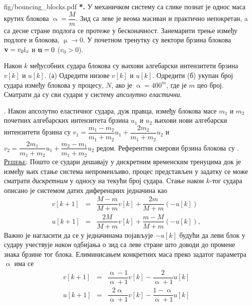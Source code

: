 \newpage
\begin{slikaDesno}{fig/bouncing_blocks.pdf}
\textbf{{\color{red}*}\ID.}
    У механичком систему са слике познат
је однос 
маса крутих блокова $
\upalpha = \dfrac{M}{m}$. 
Зид са леве је веома масиван и 
практично непокретан, a са десне стране подлога 
се протеже у бесконачност.
Занемарити трење између подлоге 
и блокова, 
$\upmu \to 0$. 
У почетном тренутку су вектори брзина 
блокова
${\bf v} = v_0 {\rm i}_x$ и
${\bf u} = 0$ ($v_0 > 0$). 
\end{slikaDesno}
Након $k$ међусобних судара блокова су 
њихови алгебарски интензитети брзина 
$v[k]$ и $u[k]$.
(а) Одредити низове $v[k]$ и $u[k]$.
Одредити (б) укупан
број судара између блокова у процесу, $N$, 
ако је $\upalpha = 400^m$, где је $m$ цео број.
Сматрати да су сви судари у систему 
\textit{апсолутно еластични}. 

\textit{}. Након 
апсолутно еластичног
судара, дуж правца, између блокова масе $m_1$ и $m_2$ 
почетних алгебарских интензитета брзина $u_1$ и 
$u_2$ њихови нови алгебарски интензитети брзина су 
$v_1 = \dfrac{m_1-m_2}{m_1+m_2} u_1 + 
\dfrac{2m_2}{m_1+m_2} u_2$  и 
$v_2 = 
\dfrac{2 m_1}{m_1+m_2} u_1
+
\dfrac{m_2 - m_1}{m_1 + m_2} u_2  
$ редом. Референтни смерови брзина блокова 
су . \\

\textsc{\underline{Решење}}: Пошто се судари дешавају у дискретним временским тренуцима 
док је између њих стање система непроменљиво, процес представљен у задатку се може сматрати
\textit{дискретним} у односу на текући број судара. Стање након $k$-тог судара описано је
системом датих диференцних једначина као 
\begin{eqnarray}
    v[k+1] & = & \dfrac{M - m}{M + m} v[k] + \dfrac{2m}{M + m} (-u[k]) \\[2mm]
    u[k+1] & = & \dfrac{2M}{M + m} v[k] + \dfrac{m - M}{M + m} (-u[k]),
\end{eqnarray} 
Важно је нагласити да се у једначинама појављује $-u[k]$ будући да леви блок у судару учествује 
\textit{након} одбијања о зид са леве стране што доводи до промене знака брзине тог блока. 
Елиминисањем конкретних маса преко задатог параметра $\upalpha$ има се
\begin{eqnarray}
    v[k+1] & = & \dfrac{\upalpha - 1}{\upalpha + 1} v[k] - \dfrac{2}{\upalpha + 1} u[k] \\[2mm]
    u[k+1] & = & \dfrac{2\upalpha}{\upalpha + 1} v[k] - \dfrac{1 - \upalpha}{\upalpha + 1} u[k]
\end{eqnarray} 


